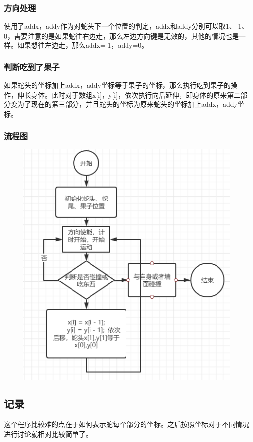 \documentclass[UTF8]{ctexart}
\begin{document}
    \subsubsection{方向处理}
    使用了addx，addy作为对蛇头下一个位置的判定，addx和addy分别可以取1、-1、0，需要注意的是如果蛇往右边走，那么左边方向键是无效的，其他的情况也是一样。如果想往左边走，那么addx=-1，addy=0。
    \subsubsection{判断吃到了果子}
    如果蛇头的坐标加上addx，addy坐标等于果子的坐标，那么执行吃到果子的操作，伸长身体。此时对于数组x[i]，y[i]，依次执行向后延伸，即身体的原来第二部分变为了现在的第三部分，并且蛇头的坐标为原来蛇头的坐标加上addx，addy坐标。
    \subsubsection{流程图}
                \begin{figure}[ht]
	\centering
	\includegraphics[scale=0.6]{4.png}
\end{figure}
    \subsection{记录}
    这个程序比较难的点在于如何表示蛇每个部分的坐标。之后按照坐标对于不同情况进行讨论就相对比较简单了。
\end{document}
